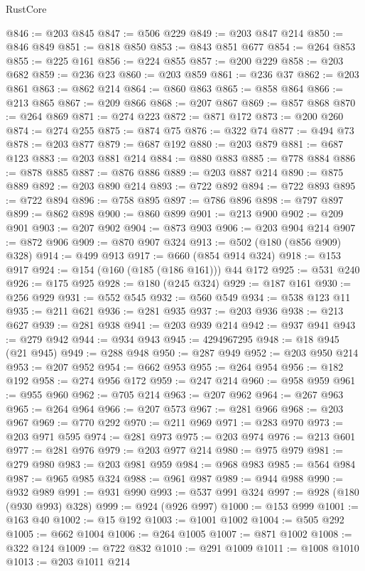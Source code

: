 \begin{lexlean}{RustCore}
\begin{coremodule}
@846 := @203 @845
@847 := @506 @229
@849 := @203 @847 @214
@850 := @846 @849
@851 := @818 @850
@853 := @843 @851 @677
@854 := @264 @853
@855 := @225 @161
@856 := @224 @855
@857 := @200 @229
@858 := @203 @682
@859 := @236 @23
@860 := @203 @859
@861 := @236 @37
@862 := @203 @861
@863 := @862 @214
@864 := @860 @863
@865 := @858 @864
@866 := @213 @865
@867 := @209 @866
@868 := @207 @867
@869 := @857 @868
@870 := @264 @869
@871 := @274 @223
@872 := @871 @172
@873 := @200 @260
@874 := @274 @255
@875 := @874 @75
@876 := @322 @74
@877 := @494 @73
@878 := @203 @877
@879 := @687 @192
@880 := @203 @879
@881 := @687 @123
@883 := @203 @881 @214
@884 := @880 @883
@885 := @778 @884
@886 := @878 @885
@887 := @876 @886
@889 := @203 @887 @214
@890 := @875 @889
@892 := @203 @890 @214
@893 := @722 @892
@894 := @722 @893
@895 := @722 @894
@896 := @758 @895
@897 := @786 @896
@898 := @797 @897
@899 := @862 @898
@900 := @860 @899
@901 := @213 @900
@902 := @209 @901
@903 := @207 @902
@904 := @873 @903
@906 := @203 @904 @214
@907 := @872 @906
@909 := @870 @907 @324
@913 := @502 (@180 (@856 @909) @328)
@914 := @499 @913
@917 := @660 (@854 @914 @324)
@918 := @153 @917
@924 := @154 (@160 (@185 (@186 @161))) @44 @172
@925 := @531 @240
@926 := @175 @925
@928 := @180 (@245 @324)
@929 := @187 @161
@930 := @256 @929
@931 := @552 @545
@932 := @560 @549
@934 := @538 @123 @11
@935 := @211 @621
@936 := @281 @935
@937 := @203 @936
@938 := @213 @627
@939 := @281 @938
@941 := @203 @939 @214
@942 := @937 @941
@943 := @279 @942
@944 := @934 @943
@945 := 4294967295
@948 := @18 @945 (@21 @945)
@949 := @288 @948
@950 := @287 @949
@952 := @203 @950 @214
@953 := @207 @952
@954 := @662 @953
@955 := @264 @954
@956 := @182 @192
@958 := @274 @956 @172
@959 := @247 @214
@960 := @958 @959
@961 := @955 @960
@962 := @705 @214
@963 := @207 @962
@964 := @267 @963
@965 := @264 @964
@966 := @207 @573
@967 := @281 @966
@968 := @203 @967
@969 := @770 @292
@970 := @211 @969
@971 := @283 @970
@973 := @203 @971 @595
@974 := @281 @973
@975 := @203 @974
@976 := @213 @601
@977 := @281 @976
@979 := @203 @977 @214
@980 := @975 @979
@981 := @279 @980
@983 := @203 @981 @959
@984 := @968 @983
@985 := @564 @984
@987 := @965 @985 @324
@988 := @961 @987
@989 := @944 @988
@990 := @932 @989
@991 := @931 @990
@993 := @537 @991 @324
@997 := @928 (@180 (@930 @993) @328)
@999 := @924 (@926 @997)
@1000 := @153 @999
@1001 := @163 @40
@1002 := @15 @192
@1003 := @1001 @1002
@1004 := @505 @292
@1005 := @662 @1004
@1006 := @264 @1005
@1007 := @871 @1002
@1008 := @322 @124
@1009 := @722 @832
@1010 := @291 @1009
@1011 := @1008 @1010
@1013 := @203 @1011 @214

\end{coremodule}
\end{lexlean}

